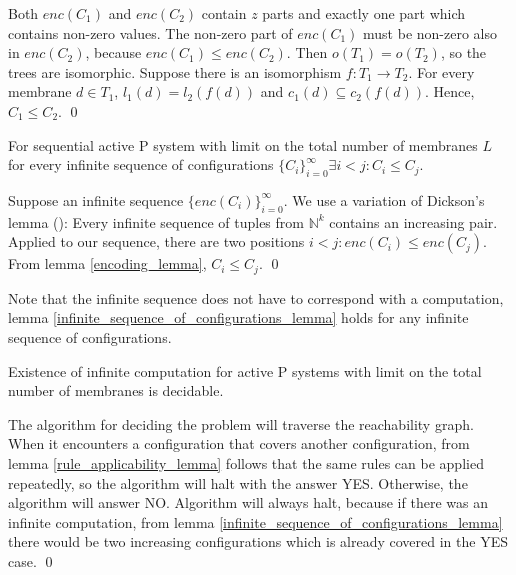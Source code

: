 \begin{dokaz}
  Both $enc(C_1)$ and $enc(C_2)$ contain $z$ parts and exactly one part which contains non-zero values. The non-zero part of $enc(C_1)$ must be non-zero also in $enc(C_2)$, because $enc(C_1)\leq enc(C_2)$. Then $o(T_1)=o(T_2)$, so the trees are isomorphic. Suppose there is an isomorphism $f:T_1\rightarrow T_2$. For every membrane $d\in T_1$, $l_1(d)=l_2(f(d))$ and $c_1(d)\subseteq c_2(f(d))$. Hence, $C_1\leq C_2$.
  \qed
\end{dokaz}

\begin{lemma}
\label{infinite_sequence_of_configurations_lemma}
  For sequential active P system with limit on the total number of membranes $L$ for every infinite sequence of configurations $\{C_i\}_{i=0}^\infty\exists i<j: C_i\leq C_j$.
\end{lemma}

\begin{dokaz}
  Suppose an infinite sequence $\{enc(C_i)\}_{i=0}^\infty$. We use a variation of Dickson's lemma (\cite{Figueira11Dickson}): Every infinite sequence of tuples from $\mathbb N^k$ contains an increasing pair. Applied to our sequence, there are two positions $i<j: enc(C_i)\leq enc(C_j)$. From lemma \ref{encoding_lemma}, $C_i\leq C_j$.
  \qed
\end{dokaz}

Note that the infinite sequence does not have to correspond with a computation, lemma \ref{infinite_sequence_of_configurations_lemma} holds for any infinite sequence of configurations.

\begin{veta}
\label{existence_of_infinite_computation_theorem}
  Existence of infinite computation for active P systems with limit on the total number of membranes is decidable.
\end{veta}

\begin{dokaz}
  The algorithm for deciding the problem will traverse the  reachability graph. When it encounters a configuration that covers another configuration, from lemma \ref{rule_applicability_lemma} follows that the same rules can be applied repeatedly, so the algorithm will halt with the answer YES.
  Otherwise, the algorithm will answer NO.
  Algorithm will always halt, because if there was an infinite computation, from lemma \ref{infinite_sequence_of_configurations_lemma} there would be two increasing configurations which is already covered in the YES case.
  \qed
\end{dokaz}

